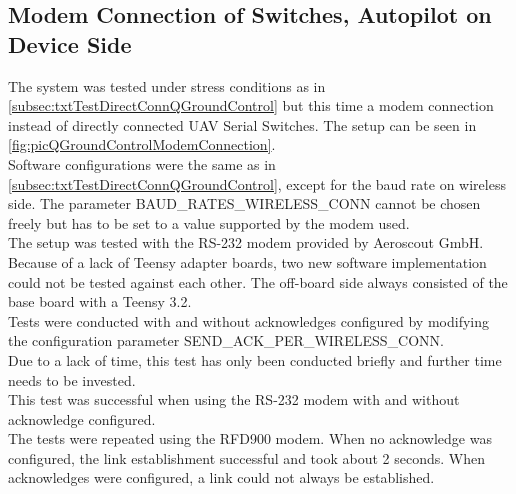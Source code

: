 \subsection{Modem Connection of Switches, Autopilot on Device Side} \label{subsec:txtTestModemtConnQGroundControl}
The system was tested under stress conditions as in \autoref{subsec:txtTestDirectConnQGroundControl} but this time a modem connection instead of directly connected UAV Serial Switches. The setup can be seen in \autoref{fig:picQGroundControlModemConnection}.\\
Software configurations were the same as in \autoref{subsec:txtTestDirectConnQGroundControl}, except for the baud rate on wireless side. The parameter BAUD\_RATES\_WIRELESS\_CONN cannot be chosen freely but has to be set to a value supported by the modem used.\\
The setup was tested with the RS-232 modem provided by Aeroscout GmbH.\\
Because of a lack of Teensy adapter boards, two new software implementation could not be tested against each other. The off-board side always consisted of the base board with a Teensy 3.2.\\
Tests were conducted with and without acknowledges configured by modifying the configuration parameter SEND\_ACK\_PER\_WIRELESS\_CONN.\\
Due to a lack of time, this test has only been conducted briefly and further time needs to be invested.\\
This test was successful when using the RS-232 modem with and without acknowledge configured.\\
The tests were repeated using the RFD900 modem. When no acknowledge was configured, the link establishment successful and took about 2 seconds. When acknowledges were configured, a link could not always be established.\\
%
%
%
%
%
%
%
%
